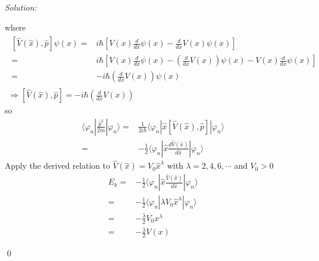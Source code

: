 \documentclass[12pt,a4paper]{article}
\newenvironment{sol}
    {\emph{Solution:}
    }
    {
    \qed
    }
\begin{document}
\begin{sol}
\begin{itemize}
\begin{itemize}
where
\begin{gather}
\begin{align}
\nonumber[\hat{V}(\hat{x}),\hat{p}]\psi(x)=&i\hbar[V(x)\frac{d}{dx}\psi(x)-\frac{d}{dx}V(x)\psi(x)]\\
\nonumber=&i\hbar[V(x)\frac{d}{dx}\psi(x)-\left(\frac{d}{dx}V(x)\right)\psi(x)-V(x)\frac{d}{dx}\psi(x)]\\
=&-i\hbar\left(\frac{d}{dx}V(x)\right)\psi(x)
\end{align}\\
\Longrightarrow[\hat{V}(\hat{x}),\hat{p}]=-i\hbar\left(\frac{d}{dx}V(x)\right)
\end{gather}
so
\begin{align}
\nonumber\langle\varphi_n|\frac{\hat{p}^2}{2m}|\varphi_n\rangle=&\frac{1}{2i\hbar}\langle\varphi_n|\hat{x}[\hat{V}(\hat{x}),\hat{p}]|\varphi_n\rangle\\
=&-\frac{1}{2}\langle\varphi_n|\hat{x}\frac{d\hat{V}(\hat{x})}{d\hat{x}}|\varphi_n\rangle
\end{align}
Apply the derived relation to $\hat{V}(\hat{x})=V_0\hat{x}^{\lambda}$ with $\lambda=2,4,6,\cdots$ and $V_0>0$
\begin{align}
\nonumber E_k=&-\frac{1}{2}\langle\varphi_n|\hat{x}\frac{\hat{V}(\hat{x})}{d\hat{x}}|\varphi_n\rangle\\
\nonumber=&-\frac{1}{2}\langle\varphi_n|\lambda V_0\hat{x}^{\lambda}|\varphi_n\rangle\\
\nonumber=&-\frac{\lambda}{2}V_0x^{\lambda}\\
=&-\frac{\lambda}{2}V(x)
\end{align}
\end{itemize}
\end{itemize}
\end{sol}
\end{document}
